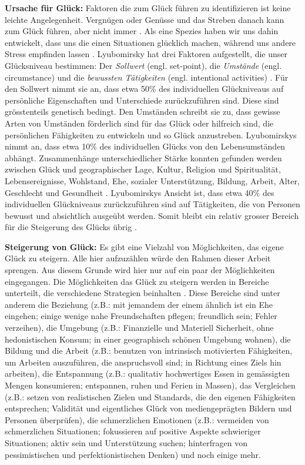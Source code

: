 \par
\textbf{Ursache für Glück:}
Faktoren die zum Glück führen zu identifizieren ist keine leichte Angelegenheit. Vergnügen oder Genüsse und das Streben danach kann zum Glück führen, aber nicht immer \cite{Diener2009, Eid2008}. Als eine Spezies haben wir uns dahin entwickelt, dass uns die einen Situationen glücklich machen, während uns andere Stress empfinden lassen \cite{Carr2011}. Lyubomirsky hat drei Faktoren aufgestellt, die unser Glücksniveau bestimmen: Der \textit{Sollwert} (engl. set-point), die \textit{Umstände} (engl. circumstance) und die \textit{bewussten Tätigkeiten} (engl. intentional activities) \cite{Lyubomirsky2008, Lyubomirsky2005}. Für den Sollwert nimmt sie an, dass etwa 50\% des individuellen Glückniveaus auf persönliche Eigenschaften und Unterschiede zurückzuführen sind. Diese sind grösstenteils genetisch bedingt. Den Umständen schreibt sie zu, dass gewisse Arten von Umständen förderlich sind für das Glück oder hilfreich sind, die persönlichen Fähigkeiten zu entwickeln und so Glück anzustreben. Lyubomirskys nimmt an, dass etwa 10\% des individuellen Glücks von den Lebensumständen abhängt. Zusammenhänge unterschiedlicher Stärke konnten gefunden werden zwischen Glück und geographischer Lage, Kultur, Religion und Spiritualität, Lebensereignisse, Wohlstand, Ehe, sozialer Unterstützung, Bildung, Arbeit, Alter, Geschlecht und Gesundheit \cite{Carr2011}. Lyubomirskys Ansicht ist, dass etwa 40\% des individuellen Glückniveaus zurückzuführen sind auf Tätigkeiten, die von Personen bewusst und absichtlich ausgeübt werden. Somit bleibt ein relativ grosser Bereich für die Steigerung des Glücks übrig \cite{Lyubomirsky2008}.
\par
\textbf{Steigerung von Glück:} Es gibt eine Vielzahl von Möglichkeiten, das eigene Glück zu steigern. Alle hier aufzuzählen würde den Rahmen dieser Arbeit sprengen. Aus diesem Grunde wird hier nur auf ein paar der Möglichkeiten eingegangen. Die Möglichkeiten das Glück zu steigern werden in Bereiche unterteilt, die verschiedene Strategien beinhalten \cite{Carr2011}. Diese Bereiche sind unter anderem die Beziehung (z.B.: mit jemandem der einem ähnlich ist ein Ehe eingehen; einige wenige nahe Freundschaften pflegen; freundlich sein; Fehler verzeihen), die Umgebung (z.B.: Finanzielle und Materiell Sicherheit, ohne hedonistischen Konsum; in einer geographisch schönen Umgebung wohnen), die Bildung und die Arbeit (z.B.: benutzen von intrinsisch motivierten Fähigkeiten, um Arbeiten auszuführen, die anspruchsvoll sind; in Richtung eines Ziels hin arbeiten), die Entspannung (z.B.: qualitativ hochwertiges Essen in gemässigten Mengen konsumieren; entspannen, ruhen und Ferien in Massen), das Vergleichen (z.B.: setzen von realistischen Zielen und Standards, die den eigenen Fähigkeiten entsprechen; Validität und eigentliches Glück von mediengeprägten Bildern und Personen überprüfen), die schmerzlichen Emotionen (z.B.: vermeiden von schmerzlichen Situationen; fokussieren auf positive Aspekte schwieriger Situationen; aktiv sein und Unterstützung suchen; hinterfragen von pessimistischen und perfektionistischen Denken) und noch einige mehr.
